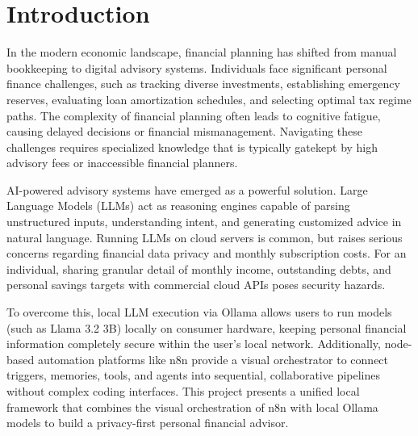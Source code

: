 \chapter{Introduction}
In the modern economic landscape, financial planning has shifted from manual bookkeeping to digital advisory systems. Individuals face significant personal finance challenges, such as tracking diverse investments, establishing emergency reserves, evaluating loan amortization schedules, and selecting optimal tax regime paths. The complexity of financial planning often leads to cognitive fatigue, causing delayed decisions or financial mismanagement. Navigating these challenges requires specialized knowledge that is typically gatekept by high advisory fees or inaccessible financial planners.

AI-powered advisory systems have emerged as a powerful solution. Large Language Models (LLMs) act as reasoning engines capable of parsing unstructured inputs, understanding intent, and generating customized advice in natural language. Running LLMs on cloud servers is common, but raises serious concerns regarding financial data privacy and monthly subscription costs. For an individual, sharing granular detail of monthly income, outstanding debts, and personal savings targets with commercial cloud APIs poses security hazards.

To overcome this, local LLM execution via Ollama allows users to run models (such as Llama 3.2 3B) locally on consumer hardware, keeping personal financial information completely secure within the user's local network. Additionally, node-based automation platforms like n8n provide a visual orchestrator to connect triggers, memories, tools, and agents into sequential, collaborative pipelines without complex coding interfaces. This project presents a unified local framework that combines the visual orchestration of n8n with local Ollama models to build a privacy-first personal financial advisor.

